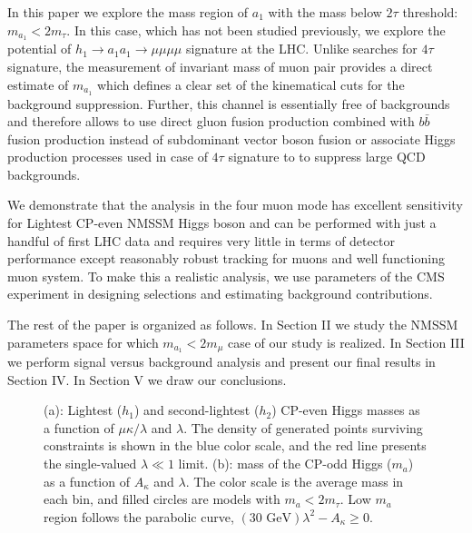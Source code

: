 \documentclass[aps,prl,nofootinbib,superscriptaddress]{revtex4}
\begin{document}
In this paper we explore the  mass region of  $a_1$ 
with the mass below $2\tau$ threshold: $m_{a_1}<2m_\tau$.
In this case, which has not been studied previously, we 
explore the potential of $h_1 \to a_1a_1 \to \mu \mu \mu \mu$ signature at the LHC.
Unlike searches for $4\tau$ signature,
the measurement of invariant mass of muon pair provides a 
direct estimate of $m_{a_1}$ which defines a clear set of the kinematical
cuts for the background suppression. 
Further, this
channel is essentially free of backgrounds and therefore allows to use
direct gluon fusion production combined with  $b\bar{b}$ fusion production
instead of subdominant  vector boson fusion or associate 
Higgs production processes used in case of $4\tau$ signature to to suppress large QCD
backgrounds.

We demonstrate that the analysis in
the four muon mode has excellent sensitivity for Lightest CP-even NMSSM Higgs boson
and can be performed with just  a handful of first LHC data and requires 
very little in terms of detector performance  except reasonably robust tracking 
for muons and well functioning muon system. To make 
this a realistic analysis, we use parameters of the CMS experiment in designing
selections and estimating background contributions.

The rest of the paper is organized as follows.
In Section II we study the NMSSM parameters space 
for which $m_{a_1}<2m_\mu$ case of our study is realized.
In Section III we perform signal versus background analysis
and present our final  results in Section IV.
In Section V we draw our conclusions.



\begin{figure*}[thbp]
\caption{(a): Lightest ($h_1$) and second-lightest ($h_2$) CP-even
  Higgs masses as a function of $\mu\kappa/\lambda$ and $\lambda$.
  The density of generated points surviving constraints is shown in
  the blue color scale, and the red line presents the single-valued
  $\lambda \ll 1$ limit.  (b): mass of the CP-odd Higgs ($m_a$) as a
  function of $A_\kappa$ and $\lambda$.  The color scale is the
  average mass in each bin, and filled circles are models with $m_a <
  2m_\tau$.  Low $m_a$ region follows the parabolic curve, $(\mbox{30~GeV})\lambda^2 - A_\kappa \ge 0$.
 \label{fig:hmass_mukoverl}}
\end{figure*}
\end{document}
